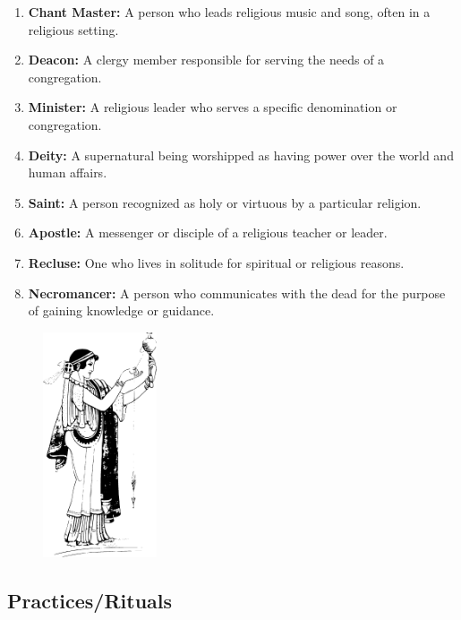 \documentclass[12pt]{book}  %
\begin{document}
\begin{enumerate}
    \item \textbf{Chant Master:} A person who leads religious music and song, often in a religious setting.
    \item \textbf{Deacon:} A clergy member responsible for serving the needs of a congregation.
    \item \textbf{Minister:} A religious leader who serves a specific denomination or congregation.
    \item \textbf{Deity:} A supernatural being worshipped as having power over the world and human affairs.
    \item \textbf{Saint:} A person recognized as holy or virtuous by a particular religion.
    \item \textbf{Apostle:} A messenger or disciple of a religious teacher or leader.
    \item \textbf{Recluse:} One who lives in solitude for spiritual or religious reasons.
    \item \textbf{Necromancer:} A person who communicates with the dead for the purpose of gaining knowledge or guidance.
\end{enumerate}

\begin{figure}[h]
    \centering
    \includegraphics[width=0.3\textwidth]{./images/religion02.pdf}
\end{figure}


\subsection{\textbf{Practices/Rituals}}
\end{document}
